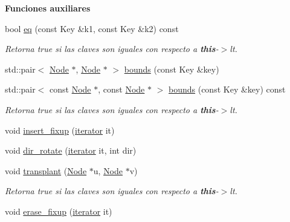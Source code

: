\begin{Indent}\textbf{ Funciones auxiliares}\par
\begin{DoxyCompactItemize}
\item 
bool \hyperlink{classaed2_1_1map_aebf6c09c424c39a874798165401b309e_aebf6c09c424c39a874798165401b309e}{eq} (const Key \&k1, const Key \&k2) const
\begin{DoxyCompactList}\small\item\em Retorna true si las claves son iguales con respecto a {\bfseries this}-\/$>$lt. \end{DoxyCompactList}\item 
std\+::pair$<$ \hyperlink{structaed2_1_1map_1_1Node}{Node} $\ast$, \hyperlink{structaed2_1_1map_1_1Node}{Node} $\ast$ $>$ \hyperlink{classaed2_1_1map_aa079b9390f988f97be26fd51ed44a2c9_aa079b9390f988f97be26fd51ed44a2c9}{bounds} (const Key \&key)
\item 
std\+::pair$<$ const \hyperlink{structaed2_1_1map_1_1Node}{Node} $\ast$, const \hyperlink{structaed2_1_1map_1_1Node}{Node} $\ast$ $>$ \hyperlink{classaed2_1_1map_a76b9671ef411cd38f918cbeadb998199_a76b9671ef411cd38f918cbeadb998199}{bounds} (const Key \&key) const
\begin{DoxyCompactList}\small\item\em Retorna true si las claves son iguales con respecto a {\bfseries this}-\/$>$lt. \end{DoxyCompactList}\item 
void \hyperlink{classaed2_1_1map_ac9197851fe5b217d45d58bbaf3612c75_ac9197851fe5b217d45d58bbaf3612c75}{insert\+\_\+fixup} (\hyperlink{classaed2_1_1map_1_1iterator}{iterator} it)
\item 
void \hyperlink{classaed2_1_1map_a94f2862ada0c9ed4f4457eac42ea8f23_a94f2862ada0c9ed4f4457eac42ea8f23}{dir\+\_\+rotate} (\hyperlink{classaed2_1_1map_1_1iterator}{iterator} it, int dir)
\item 
void \hyperlink{classaed2_1_1map_a98b9f200c64ce02dfb67902ee00e375a_a98b9f200c64ce02dfb67902ee00e375a}{transplant} (\hyperlink{structaed2_1_1map_1_1Node}{Node} $\ast$u, \hyperlink{structaed2_1_1map_1_1Node}{Node} $\ast$v)
\begin{DoxyCompactList}\small\item\em Retorna true si las claves son iguales con respecto a {\bfseries this}-\/$>$lt. \end{DoxyCompactList}\item 
void \hyperlink{classaed2_1_1map_a7870c8f26e82b00d0aeb2e9f331dfec6_a7870c8f26e82b00d0aeb2e9f331dfec6}{erase\+\_\+fixup} (\hyperlink{classaed2_1_1map_1_1iterator}{iterator} it)

\end{DoxyCompactItemize}
\end{Indent}
